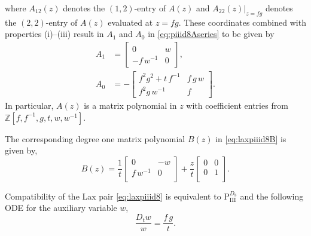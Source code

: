 \documentclass[a4paper,reqno]{amsart}
\numberwithin{equation}{section}
\numberwithin{figure}{section}
\theoremstyle{remark}
\newcommand\Pthree{\textrm{P}_{\textrm{III}}}
\begin{document}
where $A_{12}(z)$ denotes the $(1,2)$-entry of $A(z)$ and $A_{22}(z)|_{z=fg}$ denotes the $(2,2)$-entry of $A(z)$ evaluated at $z=fg$. 
These coordinates combined with properties (i)--(iii) result in $A_1$ and $A_0$ in \eqref{eq:piiid8Aseries} to be given by
\begin{align*}
A_1&=\begin{bmatrix}
 0 & w\\
 -f\,w^{-1} & 0
\end{bmatrix},\\
A_0&=-\begin{bmatrix}
f^2g^2+t\,f^{-1} & f\, g\, w\\
f^2g\,w^{-1}& f
\end{bmatrix}.
\end{align*}
In particular, $A(z)$ is a matrix polynomial in $z$ with coefficient entries from $\mathbb{Z}[f,f^{-1},g,t,w,w^{-1}]$.


The corresponding degree one matrix polynomial $B(z)$ in \eqref{eq:laxpiiid8B} is given by,
\begin{equation*}
    B(z)=\frac{1}{t}\begin{bmatrix}
 0 & -w \\
 f\,w^{-1} & 0 \\
\end{bmatrix}+\frac{z}{t}\begin{bmatrix}
 0 & 0 \\
 0 & 1\\
\end{bmatrix}.
\end{equation*}



Compatibility of the Lax pair \eqref{eq:laxpiiid8} is equivalent to $\Pthree^{D_8}$ and the following ODE for the auxiliary variable $w$,
\begin{equation*}
    \frac{D_tw}{w}=\frac{f\,g}{t}.
\end{equation*}
\end{document}
